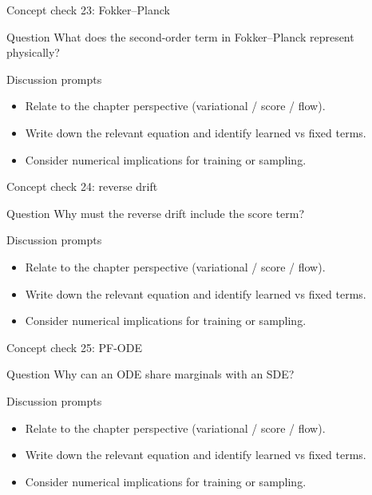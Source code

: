 \documentclass[aspectratio=169]{beamer}
\begin{document}
\begin{frame}{Concept check 23: Fokker--Planck}
\begin{block}{Question}
What does the second-order term in Fokker--Planck represent physically?
\end{block}
\begin{block}{Discussion prompts}
\begin{itemize}
\item Relate to the chapter perspective (variational / score / flow).
\item Write down the relevant equation and identify learned vs fixed terms.
\item Consider numerical implications for training or sampling.
\end{itemize}
\end{block}
\end{frame}

\begin{frame}{Concept check 24: reverse drift}
\begin{block}{Question}
Why must the reverse drift include the score term?
\end{block}
\begin{block}{Discussion prompts}
\begin{itemize}
\item Relate to the chapter perspective (variational / score / flow).
\item Write down the relevant equation and identify learned vs fixed terms.
\item Consider numerical implications for training or sampling.
\end{itemize}
\end{block}
\end{frame}

\begin{frame}{Concept check 25: PF-ODE}
\begin{block}{Question}
Why can an ODE share marginals with an SDE?
\end{block}
\begin{block}{Discussion prompts}
\begin{itemize}
\item Relate to the chapter perspective (variational / score / flow).
\item Write down the relevant equation and identify learned vs fixed terms.
\item Consider numerical implications for training or sampling.
\end{itemize}
\end{block}
\end{frame}
\end{document}
